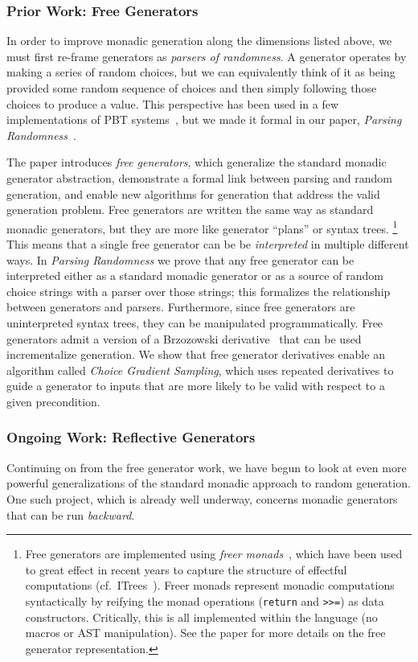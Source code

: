 \subsubsection{Prior Work: Free Generators}
In order to improve monadic generation along the dimensions listed above, we
must first re-frame generators as {\em parsers of randomness}. A generator
operates by making a series of random choices, but we can equivalently think of
it as being provided some random sequence of choices and then simply following
those choices to produce a value. This perspective has been used in a few
implementations of PBT systems~\cn{}, but we made it formal in our paper, {\em
Parsing Randomness}~\cite{goldstein2022parsing}.

The paper introduces {\em free generators}, which generalize the standard
monadic generator abstraction, demonstrate a formal link between parsing and
random generation, and enable new algorithms for generation that address the
valid generation problem. Free generators are written the same way as standard
monadic generators, but they are more like generator ``plans'' or syntax
trees.%
\footnote{Free generators are implemented using {\em freer
monads}~\cite{kiselyov2015freer}, which have been used to great effect in recent
years to capture the structure of effectful computations
(cf.~ITrees~\cite{old:xia2019interaction}). Freer monads represent
monadic 
computations syntactically by reifying the monad operations (\lstinline{return}
and \lstinline{>>=}) as data constructors. Critically, this is all implemented
within the language (no macros or AST manipulation). See the paper for more
details on the free generator representation.}
This means that a single free generator can be be {\em interpreted} in multiple
different ways. In {\em Parsing Randomness} we prove that any free generator can
  be interpreted either as a standard monadic generator or as a source of
random choice strings with a parser over those strings; this formalizes the
relationship between generators and parsers. Furthermore, since free generators
are uninterpreted syntax trees, they can be manipulated programmatically. Free
generators admit a version of a Brzozowski
derivative~\cite{brzozowski1964derivatives} that can be used incrementalize
generation. We show that free generator derivatives enable an algorithm called
{\em Choice Gradient Sampling}, which uses repeated derivatives to guide a
generator to inputs that are more likely to be valid with respect to a given
precondition.

\subsubsection{Ongoing Work: Reflective Generators}
Continuing on from the free generator work, we have begun to look at even more
powerful generalizations of the standard monadic approach to random generation.
One such project, which is already well underway, concerns monadic generators
that can be run {\em backward}.

